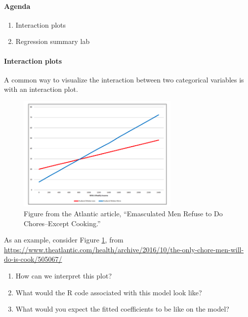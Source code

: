 \documentclass[10pt]{article}
\newcommand{\shortans}{\vspace{1in}}
\begin{document}


\paragraph{Agenda}
\begin{enumerate}
  \itemsep0em
  \item Interaction plots
  \item Regression summary lab
\end{enumerate}


\paragraph{Interaction plots}
A common way to visualize the interaction between two categorical variables is with an interaction plot. 

\begin{figure}[htbp]
\begin{center}
\includegraphics[width=0.7\textwidth]{Atlantic_Chores.png}
\caption{Figure from the Atlantic article, ``Emasculated Men Refuse to Do Chores--Except Cooking.'' \label{atlantic}}
\end{center}
\end{figure}

As an example, consider Figure \ref{atlantic}, from \url{https://www.theatlantic.com/health/archive/2016/10/the-only-chore-men-will-do-is-cook/505067/}


\begin{enumerate}
  \itemsep1in
  \item How can we interpret this plot?
  \item What would the R code associated with this model look like?
  \item What would you expect the fitted coefficients to be like on the  model?
  \shortans
\end{enumerate}
\end{document}
